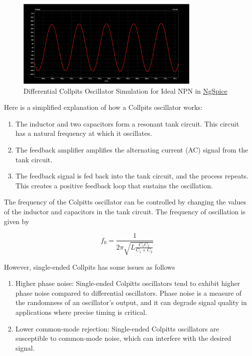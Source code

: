 \documentclass[]{extarticle}
\begin{document}
\begin{figure}[!h]
    \centering
    \includegraphics[width = 0.8\textwidth]{simulation.png}
    \caption{Differential Collpits Oscillator Simulation for Ideal NPN in \hyperref[https://ngspice.sourceforge.io]{NgSpice}}
    \label{fig:collpits-diff-sim}
\end{figure}

Here is a simplified explanation of how a Collpits oscillator works:~\cite{Razavi2001}

\begin{enumerate}
    \item The inductor and two capacitors form a resonant tank circuit. This circuit has a natural frequency at which it oscillates.
    \item The feedback amplifier amplifies the alternating current (AC) signal from the tank circuit.
    \item The feedback signal is fed back into the tank circuit, and the process repeats. This creates a positive feedback loop that sustains the oscillation.
\end{enumerate}

The frequency of the Colpitts oscillator can be controlled by changing the values of the inductor and capacitors in the tank circuit. The frequency of oscillation is given by 

\begin{equation}
    f_0 = \frac{1}{2\pi\displaystyle{\sqrt{L\frac{C_1C_2}{C_1+C_2}}}}
    \label{eg: collpits-freq-formula}
\end{equation}

However, single-ended Collpits has some issues as follows
\begin{enumerate}
    \item Higher phase noise: Single-ended Colpitts oscillators tend to exhibit higher phase noise compared to differential oscillators. Phase noise is a measure of the randomness of an oscillator's output, and it can degrade signal quality in applications where precise timing is critical.
    \item Lower common-mode rejection: Single-ended Colpitts oscillators are susceptible to common-mode noise, which can interfere with the desired signal.
\end{enumerate}
\end{document}
